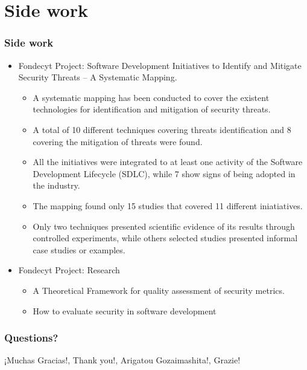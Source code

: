 \documentclass[serif,9pt]{beamer}
\begin{document}
\section{Side work}
\begin{frame}
	\frametitle{Side work}
	\begin{itemize}
		\item<1-> Fondecyt Project: Software Development Initiatives to Identify and Mitigate Security Threats -- A Systematic Mapping.
			\begin{itemize}
				\item<2-> A systematic mapping has been conducted to cover the existent technologies for identification and mitigation of security threats.
				\item<2-> A total of 10 different techniques covering threats identification and 8 covering the mitigation of threats were found. 
				\item<3-> All the initiatives were integrated to at least one activity of the Software Development Lifecycle (SDLC), while 7 show signs of being adopted in the industry. 
				\item<3-> The mapping found only 15 studies that covered 11 different iniatiatives. 
				\item<4-> Only two techniques presented scientific evidence of its results through controlled experiments, while others selected studies presented informal case studies or examples.
			\end{itemize}
		\item<5-> Fondecyt Project: Research
			\begin{itemize}
				\item<6-> A Theoretical Framework for quality assessment of security metrics.
				\item<7-> How to evaluate security in software development
			\end{itemize}
	\end{itemize}
\end{frame}


\begin{frame}
	\frametitle{Questions?}
	¡Muchas Gracias!, Thank you!, Arigatou Gozaimashita!, Grazie!
\end{frame}



\end{document}
